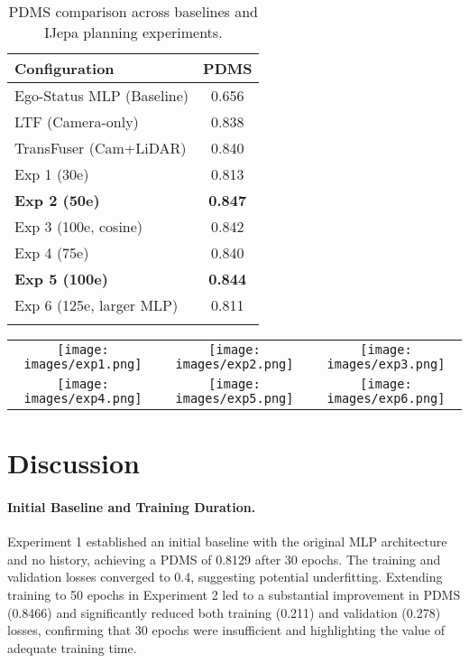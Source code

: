 \documentclass{article}
\begin{document}
\begin{table}[h]
\centering
\begin{tabular}{@{}l c@{}}
\toprule
\textbf{Configuration} &  \textbf{PDMS} \\
\midrule
\quad Ego-Status MLP (Baseline)      & 0.656 \\
\quad LTF (Camera-only)              & 0.838 \\
\quad TransFuser (Cam+LiDAR)         & 0.840 \\
\midrule
\quad Exp 1 (30e)                    & 0.813 \\
\quad \textbf{Exp 2 (50e)}           & \textbf{0.847} \\
\quad Exp 3 (100e, cosine)           & 0.842 \\
\midrule
\quad Exp 4 (75e)                    & 0.840 \\
\quad \textbf{Exp 5 (100e)}          & \textbf{0.844} \\
\quad Exp 6 (125e, larger MLP)       & 0.811 \\
\bottomrule\\
\end{tabular}
\caption{PDMS comparison across baselines and IJepa planning experiments.}
\label{tab:pdm_only}
\end{table}

\setlength{\tabcolsep}{1pt} %
\renewcommand{\arraystretch}{0}

\begin{tabular}{ccc}
    \texttt{[image: images/exp1.png]} &
    \texttt{[image: images/exp2.png]} &
    \texttt{[image: images/exp3.png]} \\[2pt]
    \texttt{[image: images/exp4.png]} &
    \texttt{[image: images/exp5.png]} &
    \texttt{[image: images/exp6.png]}
\end{tabular}

\section{Discussion}
\label{sec:discussion}

\paragraph{Initial Baseline and Training Duration.}
Experiment 1 established an initial baseline with the original MLP architecture and no history, achieving a PDMS of 0.8129 after 30 epochs. The training and validation losses converged to 0.4, suggesting potential underfitting. Extending training to 50 epochs in Experiment 2 led to a substantial improvement in PDMS (0.8466) and significantly reduced both training (0.211) and validation (0.278) losses, confirming that 30 epochs were insufficient and highlighting the value of adequate training time.
\end{document}
